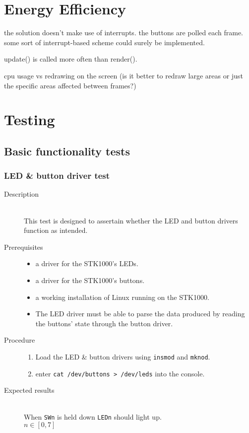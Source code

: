 \section{Energy Efficiency}
	the solution doesn't make use of interrupts.
	the buttons are polled each frame. some sort of interrupt-based scheme could surely be implemented.

	update() is called more often than render().

	cpu usage vs redrawing on the screen (is it better to redraw large areas or just the specific areas affected between frames?)

\section{Testing}
\subsection{Basic functionality tests}
	\subsubsection{LED \& button driver test}
		\begin{description}
			\item[Description] \hfill \\
				This test is designed to assertain whether the LED and button drivers function as intended.
			\item[Prerequisites] \hfill
				\begin{itemize}
					\item{a driver for the STK1000's LEDs.}
					\item{a driver for the STK1000's buttons.}
					\item{a working installation of Linux running on the STK1000.}
					\item{The LED driver must be able to parse the data produced by reading the buttons' state through the button driver.}
				\end{itemize}
			\item[Procedure] \hfill
				\begin{enumerate}
					\item{Load the LED \& button drivers using \texttt{insmod} and \texttt{mknod}.}
					\item{enter \texttt{cat /dev/buttons > /dev/leds} into the console.}
				\end{enumerate}
			\item[Expected results] \hfill \\
				When \texttt{SWn} is held down \texttt{LEDn} should light up.
				\\$n \in [0,7]$
		\end{description}	

